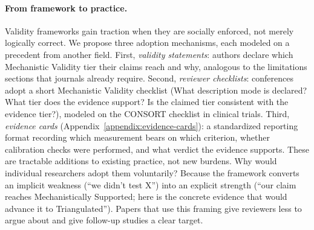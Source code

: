 \documentclass{article}
\begin{document}
\paragraph{From framework to practice.}
Validity frameworks gain traction when they are socially enforced, not merely logically correct. We propose three adoption mechanisms, each modeled on a precedent from another field. First, \emph{validity statements}: authors declare which Mechanistic Validity tier their claims reach and why, analogous to the limitations sections that journals already require. Second, \emph{reviewer checklists}: conferences adopt a short Mechanistic Validity checklist (What description mode is declared? What tier does the evidence support? Is the claimed tier consistent with the evidence tier?), modeled on the CONSORT checklist in clinical trials. Third, \emph{evidence cards} (Appendix~\ref{appendix:evidence-cards}): a standardized reporting format recording which measurement bears on which criterion, whether calibration checks were performed, and what verdict the evidence supports. These are tractable additions to existing practice, not new burdens. Why would individual researchers adopt them voluntarily? Because the framework converts an implicit weakness (``we didn't test X'') into an explicit strength (``our claim reaches Mechanistically Supported; here is the concrete evidence that would advance it to Triangulated''). Papers that use this framing give reviewers less to argue about and give follow-up studies a clear target.
\end{document}
